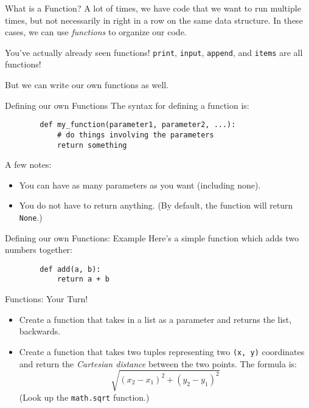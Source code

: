 \documentclass{acm}
\begin{document}
\begin{frame}[fragile]{What is a Function?}
    A lot of times, we have code that we want to run multiple times, but not
    necessarily in right in a row on the same data structure. In these cases, we
    can use \textit{functions} to organize our code.

    \pause
    You've actually already seen functions! \texttt{print}, \texttt{input},
    \texttt{append}, and \texttt{items} are all functions!

    But we can write our own functions as well.
\end{frame}

\begin{frame}[fragile]{Defining our own Functions}
    The syntax for defining a function is:
    \begin{verbatim}
        def my_function(parameter1, parameter2, ...):
            # do things involving the parameters
            return something
    \end{verbatim}

    A few notes:
    \begin{itemize}
        \item You can have as many parameters as you want (including none).
        \item You do not have to return anything. (By default, the function will
            return \texttt{None}.)
    \end{itemize}
\end{frame}

\begin{frame}[fragile]{Defining our own Functions: Example}
    Here's a simple function which adds two numbers together:
    \begin{verbatim}
        def add(a, b):
            return a + b
    \end{verbatim}
\end{frame}

\begin{frame}{Functions: Your Turn!}
    \begin{itemize}
        \item Create a function that takes in a list as a parameter and returns
            the list, backwards.
        \item Create a function that takes two tuples representing two
            \texttt{(x, y)} coordinates and return the \textit{Cartesian
            distance} between the two points. The formula is:
            $$\sqrt{(x_2 - x_1)^2 + (y_2 - y_1)^2}$$
            (Look up the \texttt{math.sqrt} function.)
    \end{itemize}
\end{frame}
\end{document}
